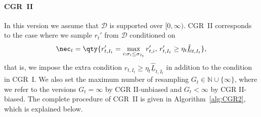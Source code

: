\paragraph{CGR~II}
In this version we assume that $\mathcal{D}$ is supported over $[0,\infty)$.
CGR~II corresponds to the case where we sample
$r_t'$ from $\mathcal{D}$ conditioned on
\begin{align}
\nec_t= \qty{r_{t,I_t}'=\max_{i:\sigma_i\leq\sigma_{I_t}}r_{t,i}',\,r_{t,I_t}'\geq\eta_t\underline{\hat{L}}_{t,I_t}},
\label{A_CGR2}
\end{align}
that is, we impose the extra condition $r_{t,I_t}\ge \eta_t\underline{\hat{L}}_{t,I_t}$ in addition to the condition in CGR~I.
We also set the maximum number of resampling $G_t\in \mathbb{N}\cup \{\infty\}$,
where we refer to the versions $G_t=\infty$ by CGR II-unbiased and $G_t<\infty$ by CGR II-biased.
The complete procedure of CGR~II is given in Algorithm~\ref{alg:CGR2}, which is explained below.


